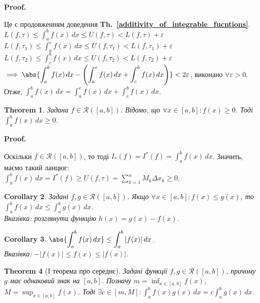 \documentclass[a4paper, 10pt]{article}
\makeatletter
\def\huge{\displaystyle}
\theoremstyle{theoremdd}
\newtheorem{theorem}{Theorem}[subsection]
\theoremstyle{theoremdd}
\theoremstyle{theoremdd}
\theoremstyle{theoremdd}
\theoremstyle{theoremdd}
\theoremstyle{theoremdd}
\theoremstyle{theoremdd}
\theoremstyle{theoremdd}
\theoremstyle{theoremdd}
\newtheorem{corollary}[theorem]{Corollary}
\newcommand\thref[1]{\textbf{Th.~\ref{#1}}}
\renewenvironment{proof}[1][Proof.\\]{\par
\pushQED{\hfill \qed}%
\normalfont \topsep6\p@\@plus6\p@\relax
\trivlist
\item\relax
{\bfseries
#1\@addpunct{.}}\hspace\labelsep\ignorespaces
}{%
\popQED\endtrivlist\@endpefalse
}
\makeatother
\begin{document}
\begin{proof}
Це є продовженням доведення \thref{additivity_of_integrable_fucntions}.\\
$L(f,\tau) \leq \huge\int_a^b f(x)\,dx \leq U(f, \tau) < L(f,\tau) + \varepsilon$\\
$L(f,\tau_1) \leq \huge\int_a^c f(x)\,dx \leq U(f,\tau_1) < L(f,\tau_1) + \varepsilon$\\
$L(f,\tau_2) \leq \huge\int_c^b f(x)\,dx \leq U(f,\tau_2) < L(f,\tau_2) + \varepsilon$\\
$\implies \abs{\huge\int_a^b f(x) \,dx - \left( \int_a^c f(x)\,dx + \int_c^b f(x)\,dx \right)} < 2\varepsilon$, виконано $\forall \varepsilon > 0$.\\
Отже, $\huge\int_a^b f(x)\,dx = \int_a^c f(x)\,dx + \int_c^b f(x)\,dx$.
\end{proof}

\begin{theorem}
Задана $f \in \mathcal{R}([a,b])$. Відомо, що $\forall x \in [a,b]: f(x) \geq 0$. Тоді $\huge\int_a^b f(x)\,dx \geq 0$.
\end{theorem}

\begin{proof}
Оскільки $f \in \mathcal{R}([a,b])$, то тоді $I_*(f) = I^*(f) = \huge\int_a^b f(x) \,dx$. Значить, маємо такий ланцюг:\\
$\huge\int_a^b f(x)\,dx = I^*(f) \geq U(f, \tau) = \huge\sum_{k=1}^n M_k \Delta x_k \geq 0$.
\end{proof}

\begin{corollary}
Задані $f,g \in \mathcal{R}([a,b])$. Якщо $\forall x \in [a,b]: f(x) \leq g(x)$, то $\huge\int_a^b f(x)\,dx \leq \int_a^b g(x)\,dx$.\\
\textit{Вказівка: розглянути функцію $h(x) = g(x) - f(x)$.}
\end{corollary}

\begin{corollary}
$\huge \abs{\int_a^b f(x)\,dx} \leq \int_a^b |f(x)|\,dx$.\\
\textit{Вказівка: $-|f(x)| \leq f(x) \leq |f(x)|$.}
\end{corollary}

\begin{theorem}[I теорема про середнє]
Задані функції $f,g \in \mathcal{R}([a,b])$, причому $g$ має однаковий знак на $[a,b]$. Позначу $m = \huge \inf_{x \in [a,b]}f(x)$, $M = \huge \sup_{x \in [a,b]}f(x)$. Тоді $\exists c \in \huge [m,M]: \int_a^b f(x)g(x)\,dx = c \int_a^b g(x)\,dx$.
\end{theorem}
\end{document}
